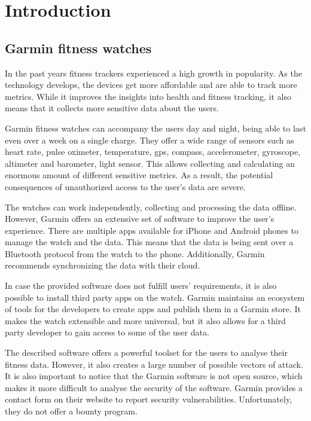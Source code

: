 \section{Introduction}


\subsection{Garmin fitness watches}

In the past years fitness trackers experienced a high growth in popularity.
As the technology develops, the devices get more affordable and are able to track more metrics.
While it improves the insights into health and fitness tracking, it also means that it collects more sensitive data about the users.

Garmin fitness watches can accompany the users day and night, being able to last even over a week on a single charge.
They offer a wide range of sensors such as heart rate, pulse oximeter, temperature, gps, compass, accelerometer, gyroscope, altimeter and barometer, light sensor.
This allows collecting and calculating an enormous amount of different sensitive metrics.
As a result, the potential consequences of unauthorized access to the user's data are severe.

The watches can work independently, collecting and processing the data offline.
However, Garmin offers an extensive set of software to improve the user's experience.
There are multiple apps available for iPhone and Android phones to manage the watch and the data.
This means that the data is being sent over a Bluetooth protocol from the watch to the phone.
Additionally, Garmin recommends synchronizing the data with their cloud.

In case the provided software does not fulfill users' requirements, it is also possible to install third party apps on the watch.
Garmin maintains an ecosystem of tools for the developers to create apps and publish them in a Garmin store.
It makes the watch extensible and more universal, but it also allows for a third party developer to gain access to some of the user data.

The described software offers a powerful toolset for the users to analyse their fitness data.
However, it also creates a large number of possible vectors of attack.
It is also important to notice that the Garmin software is not open source, which makes it more difficult to analyse the security of the software.
Garmin provides a contact form on their website to report security vulnerabilities.
Unfortunately, they do not offer a bounty program.

